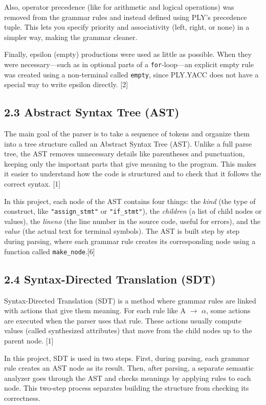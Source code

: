 \documentclass[letterpaper,12pt,oneside]{article}
\begin{document}
Also, operator precedence (like for arithmetic and logical operations) was removed from the grammar rules and instead defined using PLY’s precedence tuple. This lets you specify priority and associativity (left, right, or none) in a simpler way, making the grammar cleaner.

Finally, epsilon (empty) productions were used as little as possible. When they were necessary—such as in optional parts of a \texttt{for}-loop—an explicit empty rule was created using a non-terminal called \texttt{empty}, since PLY.YACC does not have a special way to write epsilon directly. [2]

\subsection*{2.3 Abstract Syntax Tree (AST)}

The main goal of the parser is to take a sequence of tokens and organize them into a tree structure called an Abstract Syntax Tree (AST). Unlike a full parse tree, the AST removes unnecessary details like parentheses and punctuation, keeping only the important parts that give meaning to the program. This makes it easier to understand how the code is structured and to check that it follows the correct syntax. [1]

In this project, each node of the AST contains four things: the \textit{kind} (the type of construct, like \texttt{"assign\_stmt"} or \texttt{"if\_stmt"}), the \textit{children} (a list of child nodes or values), the \textit{lineno} (the line number in the source code, useful for errors), and the \textit{value} (the actual text for terminal symbols). The AST is built step by step during parsing, where each grammar rule creates its corresponding node using a function called \texttt{make\_node}.[6]

\subsection*{2.4 Syntax-Directed Translation (SDT)}

Syntax-Directed Translation (SDT) is a method where grammar rules are linked with actions that give them meaning. For each rule like A $\rightarrow$ $\alpha$, some actions are executed when the parser uses that rule. These actions usually compute values (called synthesized attributes) that move from the child nodes up to the parent node. [1]

In this project, SDT is used in two steps. First, during parsing, each grammar rule creates an AST node as its result. Then, after parsing, a separate semantic analyzer goes through the AST and checks meanings by applying rules to each node. This two-step process separates building the structure from checking its correctness.
\end{document}
